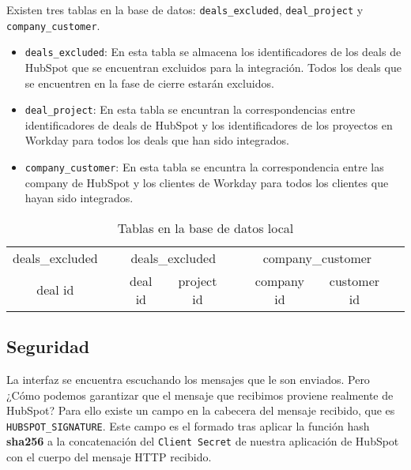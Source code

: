 \begin{itemize}[leftmargin=*]
 Existen tres tablas en la base de datos: \verb|deals_excluded|, \verb|deal_project| y \verb|company_customer|.
 
 
 \begin{itemize}
	\item \verb|deals_excluded|: En esta tabla se almacena los identificadores de los deals de HubSpot 
	que se encuentran excluidos para la integración. Todos los deals que se encuentren en la fase de
	cierre estarán excluidos.
	\item \verb|deal_project|: En esta tabla se encuntran la correspondencias entre identificadores 
	de deals de HubSpot y los identificadores de los proyectos en Workday para todos los deals que han sido integrados.
	\item \verb|company_customer|: En esta tabla se encuntra la correspondencia entre las company de HubSpot y los clientes de Workday
	para todos los clientes que hayan sido integrados.
 \end{itemize}
 
\begin{table}
		\centering
		\begin{tabular}{
		|c|c@{\hskip 1cm} 
		|c|c|c@{\hskip 1cm} 
		|c|c|c@{\hskip 1cm}
		}
		\cline{1-1}\cline{3-4}\cline{6-7}
		deals\_excluded && \multicolumn{2}{c|}{deals\_excluded} && \multicolumn{2}{c|}{company\_customer} \\
	\cline{1-1}\cline{3-4}\cline{6-7}
	deal id && deal id & project id && company id & customer id \\
	\cline{1-1}\cline{3-4}\cline{6-7}
	\end{tabular}
	\caption{Tablas en la base de datos local}
	\label{tab:tables}
\end{table}

\end{itemize}




\subsection{Seguridad}


La interfaz se encuentra escuchando los mensajes que le son enviados. Pero ¿Cómo podemos garantizar que el mensaje que recibimos proviene realmente de HubSpot?
Para ello existe un campo en la cabecera del mensaje recibido, que es \verb|HUBSPOT_SIGNATURE|. 
Este campo es el formado tras aplicar la función hash \textbf{sha256} a la concatenación del \verb|Client Secret| de nuestra aplicación de HubSpot con el cuerpo del mensaje HTTP recibido.


